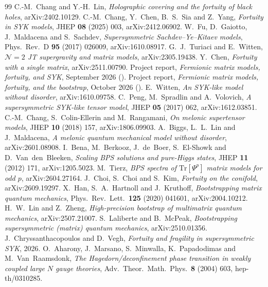 \documentclass[10pt]{article}
\newcommand{\Tr}{\mathrm{Tr}}
\begin{document}
\begin{thebibliography}{99}\small
{} C.-M.~Chang and Y.-H.~Lin, \emph{Holographic covering and the fortuity of black holes},
arXiv:2402.10129.
 C.-M.~Chang, Y.~Chen, B.~S.~Sia and Z.~Yang, \emph{Fortuity in SYK models}, JHEP \textbf{08} (2025)
003, arXiv:2412.06902.
 W.~Fu, D.~Gaiotto, J.~Maldacena and S.~Sachdev, \emph{Supersymmetric Sachdev--Ye--Kitaev models},
Phys.\ Rev.\ D \textbf{95} (2017) 026009, arXiv:1610.08917.
 G.~J.~Turiaci and E.~Witten, \emph{$\mathcal N=2$ JT supergravity and matrix models},
arXiv:2305.19438.
 Y.~Chen, \emph{Fortuity with a single matrix}, arXiv:2511.00790.
 Project report, \emph{Fermionic matrix models, fortuity, and SYK}, September 2026
().
 Project report, \emph{Fermionic matrix models, fortuity, and the bootstrap}, October 2026
().
 E.~Witten, \emph{An SYK-like model without disorder}, arXiv:1610.09758.
 C.~Peng, M.~Spradlin and A.~Volovich, \emph{A supersymmetric SYK-like tensor model}, JHEP \textbf{05}
(2017) 062, arXiv:1612.03851.
 C.-M.~Chang, S.~Colin-Ellerin and M.~Rangamani, \emph{On melonic supertensor models}, JHEP \textbf{10}
(2018) 157, arXiv:1806.09903.
 A.~Biggs, L.~L.~Lin and J.~Maldacena, \emph{A melonic quantum mechanical model without disorder},
arXiv:2601.08908.
 I.~Bena, M.~Berkooz, J.~de~Boer, S.~El-Showk and D.~Van~den~Bleeken, \emph{Scaling BPS solutions and
pure-Higgs states}, JHEP \textbf{11} (2012) 171, arXiv:1205.5023.
 M.~Tierz, \emph{BPS spectra of $\Tr[\Psi^p]$ matrix models for odd $p$}, arXiv:2604.27164.
 J.~Choi, S.~Choi and S.~Kim, \emph{Fortuity on the conifold}, arXiv:2609.19297.
 X.~Han, S.~A.~Hartnoll and J.~Kruthoff, \emph{Bootstrapping matrix quantum mechanics}, Phys.\ Rev.\
Lett.\ \textbf{125} (2020) 041601, arXiv:2004.10212.
 H.~W.~Lin and Z.~Zheng, \emph{High-precision bootstrap of multimatrix quantum mechanics},
arXiv:2507.21007.
 S.~Laliberte and B.~McPeak, \emph{Bootstrapping supersymmetric (matrix) quantum mechanics},
arXiv:2510.01356.
 J.~Chryssanthacopoulos and D.~Vegh, \emph{Fortuity and fragility in supersymmetric SYK}, 2026.
\bibitem{AMMPV} O.~Aharony, J.~Marsano, S.~Minwalla, K.~Papadodimas and M.~Van~Raamsdonk, \emph{The
Hagedorn/deconfinement phase transition in weakly coupled large $N$ gauge theories}, Adv.\ Theor.\ Math.\ Phys.\
\textbf{8} (2004) 603, hep-th/0310285.
\end{thebibliography}
\end{document}
